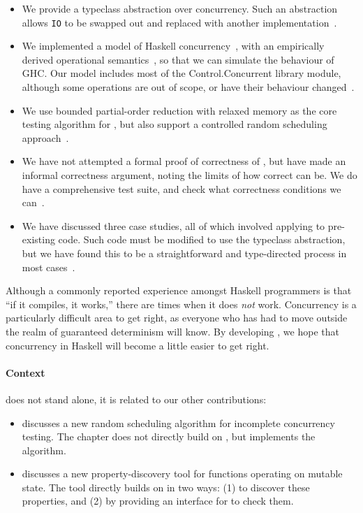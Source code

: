 \begin{itemize}
\item We provide a typeclass abstraction over concurrency.  Such an
  abstraction allows \verb|IO| to be swapped out and replaced with
  another implementation~.

\item We implemented a model of Haskell
  concurrency~, with an empirically derived
  operational semantics~, so that we can
  simulate the behaviour of GHC.  Our model includes most of the
  Control.Concurrent library module, although some operations are out
  of scope, or have their behaviour changed~.

\item We use bounded partial-order reduction\cite{coons2013} with
  relaxed memory\cite{zhang2015} as the core testing algorithm for
  \dejafu{}, but also support a controlled random scheduling
  approach~.

\item We have not attempted a formal proof of correctness of
  \dejafu{}, but have made an informal correctness argument, noting
  the limits of how correct \dejafu{} can be.  We do have a
  comprehensive test suite, and check what correctness conditions we
  can~.

\item We have discussed three case studies, all of which involved
  applying \dejafu{} to pre-existing code.  Such code must be modified
  to use the \dejafu{} typeclass abstraction, but we have found this
  to be a straightforward and type-directed process in most
  cases~.
\end{itemize}

Although a commonly reported experience amongst Haskell programmers is
that ``if it compiles, it works,'' there are times when it does
\emph{not} work.  Concurrency is a particularly difficult area to get
right, as everyone who has had to move outside the realm of guaranteed
determinism will know.  By developing \dejafu{}, we hope that
concurrency in Haskell will become a little easier to get right.

\paragraph{Context}
\dejafu{} does not stand alone, it is related to our other
contributions:

\begin{itemize}
\item {} discusses a new random scheduling
  algorithm for incomplete concurrency testing.  The chapter does not
  directly build on \dejafu{}, but \dejafu{} implements the algorithm.
\item {} discusses a new property-discovery tool for
  functions operating on mutable state.  The tool directly builds on
  \dejafu{} in two ways: (1) to discover these properties, and (2) by
  providing an interface for \dejafu{} to check them.
\end{itemize}
